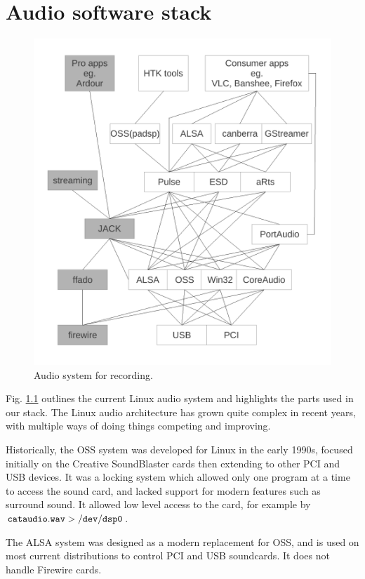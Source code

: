 \documentclass[oneside,english]{scrbook}
\begin{document}
\chapter{Audio software stack}

\begin{figure}
  \centering
  \includegraphics[width=\columnwidth]{figs/linuxaudiosystem-studio.pdf}
  \caption{Audio system for recording.}
  \label{fig:audio-rec}
\end{figure}

Fig. \ref{fig:audio-rec} outlines the current Linux audio system and highlights the parts used in our stack.  The Linux audio architecture has grown quite complex in recent years, with multiple ways of doing things competing and improving.

Historically, the OSS system was developed for Linux in the early 1990s, focused initially on the Creative SoundBlaster cards then extending to other PCI and USB devices.  It was a locking system which allowed only one program at a time to access the sound card, and lacked support for modern features such as surround sound. It allowed low level access to the card, for example by $\tt cat audio.wav > /dev/dsp0$.  

The ALSA system was designed as a modern replacement for OSS, and is used on most current distributions to control PCI and USB soundcards.  It does not handle Firewire cards.
\end{document}
